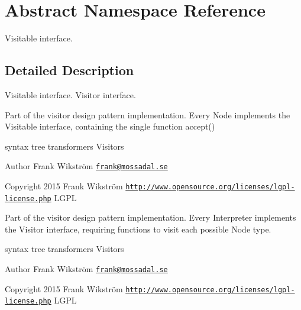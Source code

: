 \hypertarget{namespaceAbstract}{\section{Abstract Namespace Reference}
\label{namespaceAbstract}
}


Visitable interface.  




\subsection{Detailed Description}
Visitable interface. Visitor interface.

Part of the visitor design pattern implementation. Every Node implements the Visitable interface, containing the single function accept()

syntax tree transformers  Visitors \begin{DoxyAuthor}{Author}
Frank Wikström \href{mailto:frank@mossadal.se}{\tt frank@mossadal.\-se} 
\end{DoxyAuthor}
\begin{DoxyCopyright}{Copyright}
2015 Frank Wikström  \href{http://www.opensource.org/licenses/lgpl-license.php}{\tt http\-://www.\-opensource.\-org/licenses/lgpl-\/license.\-php} L\-G\-P\-L
\end{DoxyCopyright}
Part of the visitor design pattern implementation. Every Interpreter implements the Visitor interface, requiring functions to visit each possible Node type.

syntax tree transformers  Visitors \begin{DoxyAuthor}{Author}
Frank Wikström \href{mailto:frank@mossadal.se}{\tt frank@mossadal.\-se} 
\end{DoxyAuthor}
\begin{DoxyCopyright}{Copyright}
2015 Frank Wikström  \href{http://www.opensource.org/licenses/lgpl-license.php}{\tt http\-://www.\-opensource.\-org/licenses/lgpl-\/license.\-php} L\-G\-P\-L 
\end{DoxyCopyright}

